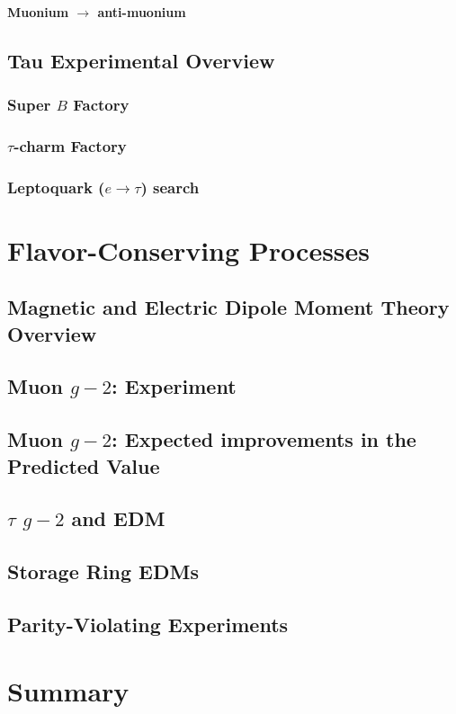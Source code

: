 \paragraph{Muonium $\to$ anti-muonium}

\subsection{Tau Experimental Overview}\label{sec:cl:tauexp}


\subsubsection{Super $B$ Factory}

\subsubsection{$\tau$-charm Factory}

\subsubsection{Leptoquark ($e \to \tau$) search}

\section{Flavor-Conserving Processes}\label{sec:cl:fcp}

\subsection{ Magnetic and Electric Dipole Moment Theory Overview}\label{sec:cl:fct}


\subsection{Muon $g-2$:  Experiment}


\subsection{Muon $g-2$:  Expected improvements in the Predicted Value}


\subsection{$\tau$ $g-2$ and EDM}

\subsection{Storage Ring EDMs}


\subsection{Parity-Violating Experiments}\label{sec:cl:pve}


\section{Summary}\label{sec:cl:gm2edmdisc}




